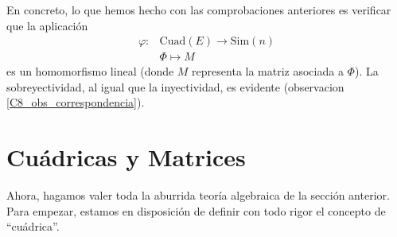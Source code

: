 En concreto, lo que hemos hecho con las comprobaciones anteriores es verificar que la aplicación
\[\begin{array}{cc}\varphi:&\mathrm{Cuad}(E)\to\mathrm{Sim}(n)\\&\Phi\mapsto M\end{array}\]
es un homomorfismo lineal (donde $M$ representa la matriz asociada a $\Phi$). La sobreyectividad, al igual que la inyectividad, es evidente (observacion \ref{C8_obs_correspondencia}).
\section{Cuádricas y Matrices}
Ahora, hagamos valer toda la aburrida teoría algebraica de la sección anterior. Para empezar, estamos en disposición de definir con todo rigor el concepto de ``cuádrica''.

